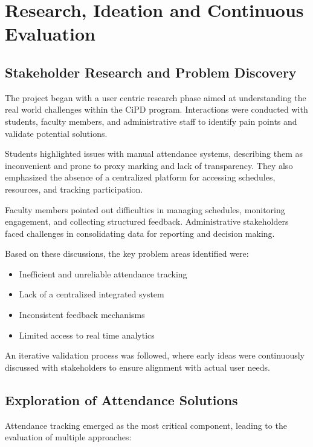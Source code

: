 \chapter{Research, Ideation and Continuous Evaluation}{\label{ch:lit_review}}

\section{Stakeholder Research and Problem Discovery}

The project began with a user centric research phase aimed at understanding the real world
challenges within the CiPD program. Interactions were conducted with students, faculty members,
and administrative staff to identify pain points and validate potential solutions.

Students highlighted issues with manual attendance systems, describing them as inconvenient and
prone to proxy marking and lack of transparency. They also emphasized the absence of a centralized
platform for accessing schedules, resources, and tracking participation.

Faculty members pointed out difficulties in managing schedules, monitoring engagement, and
collecting structured feedback. Administrative stakeholders faced challenges in consolidating data for
reporting and decision making.

Based on these discussions, the key problem areas identified were:

\begin{itemize}
    \item Inefficient and unreliable attendance tracking
    \item Lack of a centralized integrated system
    \item Inconsistent feedback mechanisms
    \item Limited access to real time analytics
\end{itemize}

An iterative validation process was followed, where early ideas were continuously discussed with
stakeholders to ensure alignment with actual user needs.

\section{Exploration of Attendance Solutions}

Attendance tracking emerged as the most critical component, leading to the evaluation of multiple
approaches:

